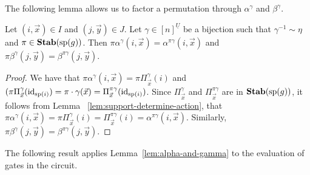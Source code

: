 \documentclass[../paper.tex]{subfiles}
\begin{document}
The following lemma allows us to factor a permutation through $\alpha^{\gamma}$
and $\beta^{\gamma}$.

\begin{lem}
  \label{lem:alpha-and-gamma}
	Let $(i,\vec{x}) \in I$ and $(j, \vec{y}) \in J$. Let $\gamma \in
  [n]^{\underline{U}}$ be a bijection such that $\gamma^{-1} \sim \eta$ and $\pi
  \in \text{\textbf{Stab}} (\text{sp} (g))$. Then $\pi \alpha^{\gamma}(i, \vec{x}) = \alpha^{\pi
    \gamma}(i, \vec{x})$ and $\pi \beta^{\gamma}(j, \vec{y}) = \beta^{\pi
    \gamma}(j, \vec{y})$.
\end{lem}
\begin{proof}
	We have that $\pi \alpha^{\gamma}(i, \vec{x}) = \pi \Pi^{\gamma}_{\vec{x}}(i)$
  and $(\pi \Pi^{\gamma}_{\vec{x}}(\operatorname{id}_{\text{sp}(i)}) = \pi \cdot \gamma (\vec{x})
  = \Pi^{\pi \gamma}_{\vec{x}}(\operatorname{id}_{\text{sp}(i)})$. Since $\Pi^{\gamma}_{\vec{x}}$
  and $\Pi^{\pi \gamma}_{\vec{x}}$ are in $\text{\textbf{Stab}} (\text{sp} (g))$, it follows from Lemma
  ~\ref{lem:support-determine-action}, that $\pi \alpha^{\gamma}(i, \vec{x}) =
  \pi \Pi^{\gamma}_{\vec{x}} (i) = \Pi^{\pi \gamma}_{\vec{x}}(i) = \alpha^{\pi
    \gamma}(i, \vec{x})$. Similarly, $\pi \beta^{\gamma}(j, \vec{y}) =
  \beta^{\pi \gamma} (j, \vec{y})$.
\end{proof}

The following result applies Lemma~\ref{lem:alpha-and-gamma} to the evaluation
of gates in the circuit.
\end{document}
